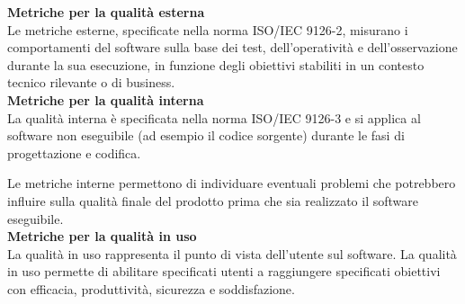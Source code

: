 		\textbf{Metriche per la qualità esterna}\\
		
			Le metriche esterne, specificate nella norma ISO/IEC 9126-2, misurano i comportamenti del software sulla base dei test, dell'operatività e dell'osservazione durante la sua esecuzione, in funzione degli obiettivi stabiliti in un contesto tecnico rilevante o di business.\\
			
		\textbf{Metriche per la qualità interna}\\
		
			La qualità interna è specificata nella norma ISO/IEC 9126-3 e si applica al software non eseguibile (ad esempio il codice sorgente) durante le fasi di progettazione e codifica. 

			Le metriche interne permettono di individuare eventuali problemi che potrebbero influire sulla qualità finale del prodotto prima che sia realizzato il software eseguibile.\\

		\textbf{Metriche per la qualità in uso}\\
		
			La qualità in uso rappresenta il punto di vista dell'utente sul software. La qualità in uso permette di abilitare specificati utenti a raggiungere specificati obiettivi con efficacia, produttività, sicurezza e soddisfazione.


		
			
			
		